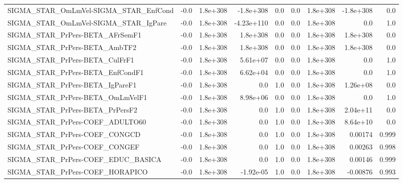 \begin{tabular}{lrrrrrrrr}
SIGMA\_STAR\_OmLmVel-SIGMA\_STAR\_EnfCond &        -0.0 &     1.8e+308 &  -1.8e+308 &      0.0 &        0.0 &    1.8e+308 &    -1.8e+308 &           0.0 \\
SIGMA\_STAR\_OmLmVel-SIGMA\_STAR\_IgPare  &        -0.0 &     1.8e+308 & -4.23e+110 &      0.0 &        0.0 &    1.8e+308 &          0.0 &           1.0 \\
SIGMA\_STAR\_PrPers-BETA\_AFrSemF1       &        -0.0 &     1.8e+308 &   1.8e+308 &      0.0 &        0.0 &    1.8e+308 &     1.8e+308 &           0.0 \\
SIGMA\_STAR\_PrPers-BETA\_AmbTF2         &        -0.0 &     1.8e+308 &   1.8e+308 &      0.0 &        0.0 &    1.8e+308 &     1.8e+308 &           0.0 \\
SIGMA\_STAR\_PrPers-BETA\_CulFrF1        &        -0.0 &     1.8e+308 &   5.61e+07 &      0.0 &        0.0 &    1.8e+308 &          0.0 &           1.0 \\
SIGMA\_STAR\_PrPers-BETA\_EnfCondF1      &        -0.0 &     1.8e+308 &   6.62e+04 &      0.0 &        0.0 &    1.8e+308 &          0.0 &           1.0 \\
SIGMA\_STAR\_PrPers-BETA\_IgPareF1       &        -0.0 &     1.8e+308 &        0.0 &      1.0 &        0.0 &    1.8e+308 &     1.26e+08 &           0.0 \\
SIGMA\_STAR\_PrPers-BETA\_OmLmVelF1      &        -0.0 &     1.8e+308 &   8.98e+06 &      0.0 &        0.0 &    1.8e+308 &          0.0 &           1.0 \\
SIGMA\_STAR\_PrPers-BETA\_PrPersF2       &        -0.0 &     1.8e+308 &        0.0 &      1.0 &        0.0 &    1.8e+308 &     2.04e+11 &           0.0 \\
SIGMA\_STAR\_PrPers-COEF\_ADULTO60       &        -0.0 &     1.8e+308 &        0.0 &      1.0 &        0.0 &    1.8e+308 &     8.64e+10 &           0.0 \\
SIGMA\_STAR\_PrPers-COEF\_CONGCD         &        -0.0 &     1.8e+308 &        0.0 &      1.0 &        0.0 &    1.8e+308 &      0.00174 &         0.999 \\
SIGMA\_STAR\_PrPers-COEF\_CONGEF         &        -0.0 &     1.8e+308 &        0.0 &      1.0 &        0.0 &    1.8e+308 &      0.00263 &         0.998 \\
SIGMA\_STAR\_PrPers-COEF\_EDUC\_BASICA    &        -0.0 &     1.8e+308 &        0.0 &      1.0 &        0.0 &    1.8e+308 &      0.00146 &         0.999 \\
SIGMA\_STAR\_PrPers-COEF\_HORAPICO       &        -0.0 &     1.8e+308 &  -1.92e-05 &      1.0 &        0.0 &    1.8e+308 &     -0.00876 &         0.993 \\

\end{tabular}
